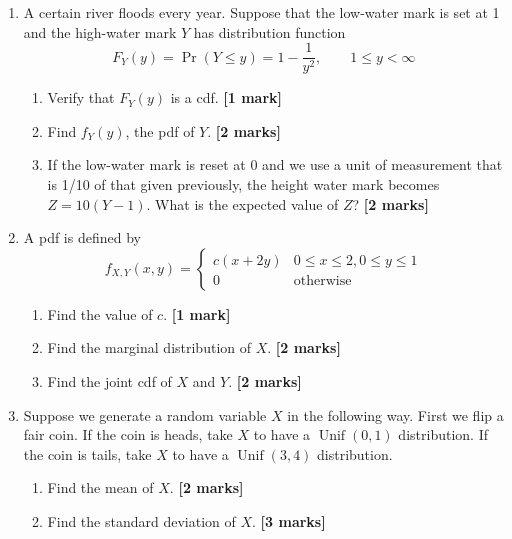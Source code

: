 \documentclass[
]{book}
\providecommand{\tightlist}{%
  \setlength{\itemsep}{0pt}\setlength{\parskip}{0pt}}
\DeclareMathOperator{\Unif}{Unif}
\theoremstyle{definition}
\theoremstyle{definition}
\theoremstyle{definition}
\theoremstyle{definition}
\theoremstyle{remark}
\begin{document}
\begin{enumerate}
\def\labelenumi{\arabic{enumi}.}
\item
  A certain river floods every year. Suppose that the low-water mark is set at 1 and the high-water mark \(Y\) has distribution function
  \[
  F_Y(y) = \Pr(Y\leq y) = 1 - \frac{1}{y^2}, \hspace{2em} 1\leq y<\infty
  \]

  \begin{enumerate}
  \def\labelenumii{(\alph{enumii})}
  \tightlist
  \item
    Verify that \(F_Y(y)\) is a cdf. \textbf{{[}1 mark{]}}
  \item
    Find \(f_Y(y)\), the pdf of \(Y\). \textbf{{[}2 marks{]}}
  \item
    If the low-water mark is reset at 0 and we use a unit of measurement that is 1/10 of that given previously, the height water mark becomes \(Z=10(Y-1)\). What is the expected value of \(Z\)? \textbf{{[}2 marks{]}}
  \end{enumerate}
\item
  A pdf is defined by
  \[
  f_{X,Y}(x,y) = \begin{cases}
   c(x+2y) &0\leq x \leq 2, 0\leq y \leq 1 \\
   0&\text{otherwise}
  \end{cases}
  \]

  \begin{enumerate}
  \def\labelenumii{(\alph{enumii})}
  \tightlist
  \item
    Find the value of \(c\). \textbf{{[}1 mark{]}}
  \item
    Find the marginal distribution of \(X\). \textbf{{[}2 marks{]}}
  \item
    Find the joint cdf of \(X\) and \(Y\). \textbf{{[}2 marks{]}}
  \end{enumerate}
\item
  Suppose we generate a random variable \(X\) in the following way. First we flip a fair coin. If the coin is heads, take \(X\) to have a \(\Unif(0,1)\) distribution. If the coin is tails, take \(X\) to have a \(\Unif(3,4)\) distribution.

  \begin{enumerate}
  \def\labelenumii{(\alph{enumii})}
  \tightlist
  \item
    Find the mean of \(X\). \textbf{{[}2 marks{]}}
  \item
    Find the standard deviation of \(X\). \textbf{{[}3 marks{]}}
  \end{enumerate}
\end{enumerate}
\end{document}
